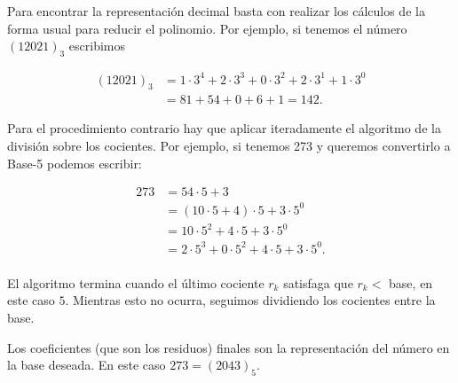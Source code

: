 \documentclass[10pt, letterpaper]{article}
\begin{document}
\newpage

Para encontrar la representación decimal basta con realizar los cálculos de la forma usual para reducir el polinomio. Por ejemplo, si tenemos el número $(12021)_3$ escribimos

\begin{align*}
	(12021)_3 &= 1\cdot 3^4 + 2\cdot 3^3 + 0\cdot 3^2 + 2\cdot 3^1 + 1\cdot 3^0 \\
	&= 81 + 54 + 0 + 6 + 1 = 142.
\end{align*}

\vspace{3em}

Para el procedimiento contrario hay que aplicar iteradamente el algoritmo de la división sobre los cocientes. Por ejemplo, si tenemos 273 y queremos convertirlo a Base-5 podemos escribir:

\begin{align*}
	273 &= 54\cdot 5 + 3 \\
	&= (10\cdot 5 + 4)\cdot 5 + 3 \cdot 5^0 \\
	&= 10\cdot 5^2 + 4\cdot 5 + 3 \cdot 5^0 \\
	&= 2\cdot 5^3 + 0\cdot 5^2 + 4\cdot 5 + 3 \cdot 5^0. \\
\end{align*}

El algoritmo termina cuando el último cociente $r_k$ satisfaga que $r_k <$ base, en este caso $5$. Mientras esto no ocurra, seguimos dividiendo los cocientes entre la base.

\noindent Los coeficientes (que son los residuos) finales son la representación del número en la base deseada. En este caso $273=(2043)_5$.
\end{document}
